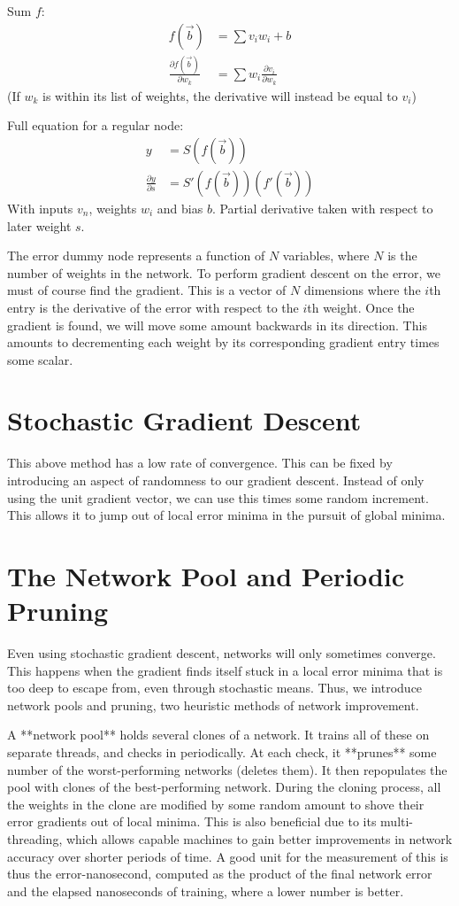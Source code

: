 \documentclass[8pt]{amsart}
\begin{document}
Sum $f$:
$$
\begin{aligned}
    f(\vec{b}) &= \sum{v_i w_i} + b \\
    \frac{\partial f(\vec{b})}{\partial w_k} &= \sum{w_i \frac{\partial v_i}{\partial w_k}}
\end{aligned}
$$
(If $w_k$ is within its list of weights, the derivative will instead be equal to $v_i$)

Full equation for a regular node:
$$
\begin{aligned}
    y &= S(f(\vec{b})) \\
    \frac{\partial y}{\partial s} &= S'(f(\vec{b}))(f'(\vec{b}))
\end{aligned}
$$
With inputs $v_n$, weights $w_i$ and bias $b$.
Partial derivative taken with respect to later weight $s$.

The error dummy node represents a function of $N$ variables, where $N$ is the
number of weights in the network. To perform gradient descent on the error, we
must of course find the gradient. This is a vector of $N$ dimensions where the
$i$th entry is the derivative of the error with respect to the $i$th weight.
Once the gradient is found, we will move some amount backwards in its direction.
This amounts to decrementing each weight by its corresponding gradient entry
times some scalar.

\section{Stochastic Gradient Descent}

This above method has a low rate of convergence. This can be fixed by
introducing an aspect of randomness to our gradient descent. Instead of only
using the unit gradient vector, we can use this times some random increment. This
allows it to jump out of local error minima in the pursuit of global minima.

\section{The Network Pool and Periodic Pruning}

Even using stochastic gradient descent, networks will only sometimes converge.
This happens when the gradient finds itself stuck in a local error minima that is
too deep to escape from, even through stochastic means. Thus, we introduce
network pools and pruning, two heuristic methods of network improvement.

A **network pool** holds several clones of a network. It trains all of these on
separate threads, and checks in periodically. At each check, it **prunes** some
number of the worst-performing networks (deletes them). It then repopulates the
pool with clones of the best-performing network. During the cloning process, all
the weights in the clone are modified by some random amount to shove their
error gradients out of local minima. This is also beneficial due to its multi-
threading, which allows capable machines to gain better improvements in network
accuracy over shorter periods of time. A good unit for the measurement of this
is thus the error-nanosecond, computed as the product of the final network error
and the elapsed nanoseconds of training, where a lower number is better.
\end{document}
